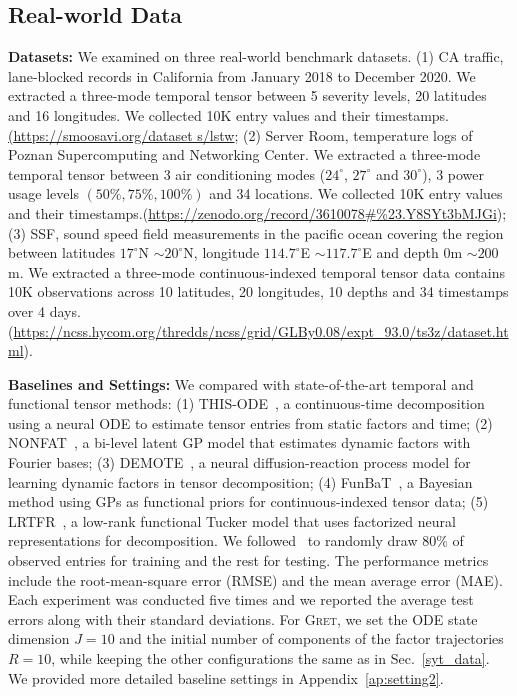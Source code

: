 \subsection{Real-world Data}
 \textbf{Datasets:} We examined \MODEL  on three real-world benchmark datasets. (1) CA traffic,   lane-blocked records  in California from January 2018 to December 2020. We extracted a three-mode temporal tensor between 5 severity levels,  20 latitudes and 16 longitudes. We collected 10K entry values and their timestamps.\url{(https://smoosavi.org/dataset s/lstw}; (2) Server Room,  temperature logs of Poznan Supercomputing and Networking Center. We extracted a three-mode temporal tensor between 3 air conditioning modes ($24^{\circ}$,  $27^{\circ}$ and $30^{\circ}$),  3 power usage levels $(50\%,  75\%,  100\%)$ and 34 locations. We collected 10K entry values and their timestamps.(\url{https://zenodo.org/record/3610078#%23.Y8SYt3bMJGi}); (3) SSF,  sound speed field measurements in the pacific ocean covering the region between latitudes $17^{\circ}$N $\sim 20^{\circ}$N,  longitude $114.7^{\circ}$E $\sim 117.7^{\circ}$E and depth $0$m $\sim200$m. 
We extracted a three-mode continuous-indexed temporal tensor data contains 10K observations across 10 latitudes,  20 longitudes,  10 depths  and 34 timestamps over 4 days. (\url{https://ncss.hycom.org/thredds/ncss/grid/GLBy0.08/expt_93.0/ts3z/dataset.html}).

\textbf{Baselines and Settings:} We compared \MODEL with state-of-the-art temporal and functional tensor methods: (1) THIS-ODE~\citep{thisode},  a continuous-time decomposition using a neural ODE to estimate tensor entries from static factors and time; (2) NONFAT~\citep{NONFAT},  a bi-level latent GP model that estimates dynamic factors  with  Fourier bases; (3) DEMOTE~\citep{wang2023dynamicdemote},  a neural diffusion-reaction process model for learning dynamic factors in tensor decomposition; (4) FunBaT~\citep{fang2023functional},  a Bayesian method using GPs as functional priors for continuous-indexed tensor data;  (5) LRTFR~\citep{luo2023lowrank},  a low-rank functional Tucker model that uses factorized neural representations for decomposition. 
We followed~\citep{wang2023dynamicdemote, fang2023functional} to randomly draw $80\%$ of observed entries for training  and the rest for testing. 
The performance metrics include the root-mean-square error (RMSE) and the  mean average error (MAE).
Each experiment was conducted five times and we reported the average test errors along with their standard deviations. For \textsc{Gret},  we set  the ODE state dimension $J=10$ and  the initial number
of components of the factor trajectories $R = 10$, 
while keeping the other configurations the same as in Sec.~\ref{syt_data}. We provided more detailed baseline settings  in Appendix~\ref{ap:setting2}.



